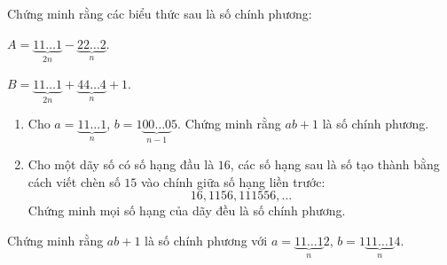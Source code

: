\begin{bt}%
	Chứng minh rằng các biểu thức sau là số chính phương:
	\begin{enumEX}{2}
		\item $A=\underbrace{11 \dotsc 1}_{2n}-\underbrace{22 \dotsc 2}_{n}$.
		\item $B=\underbrace{11 \dotsc 1}_{2n}+\underbrace{44 \dotsc 4}_{n}+1$.
	\end{enumEX}
\end{bt}


\begin{bt}%
	\begin{enumerate}
		\item Cho $a=\underbrace{11 \dotsc 1}_{n}$, $b=1\underbrace{00 \dotsc 0}_{n-1}5$. Chứng minh rằng $ab+1$ là số chính phương.
		\item Cho một dãy số có số hạng đầu là $16$, các số hạng sau là số tạo thành bằng cách viết chèn số $15$ vào chính giữa số hạng liền trước:
		$$ 16, 1156, 111556, \dotsc $$
		Chứng minh mọi số hạng của dãy đều là số chính phương.
	\end{enumerate}
\end{bt}


\begin{bt}%
	Chứng minh rằng $ab+1$ là số chính phương với $a=\underbrace{11 \dotsc 1}_{n}2$, $b=1\underbrace{11 \dotsc 1}_{n}4$.
\end{bt}


